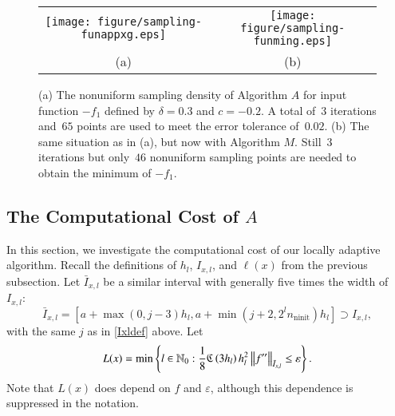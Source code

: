 \documentclass[review]{elsarticle}
\newcommand{\abstol}{\varepsilon}
\theoremstyle{definition}
\newcommand{\Ixl}{I_{x,l}}
\DeclareMathOperator{\ninit}{ninit}
\begin{document}
\begin{figure}[t]
	\begin{tabular}{cc}	
		\texttt{[image: figure/sampling-funappxg.eps]}
		&\texttt{[image: figure/sampling-funming.eps]}
		\\ (a) & (b)
	\end{tabular}
	\caption{(a) The nonuniform sampling density of Algorithm $A$ for input function
		$-f_1$ defined by $\delta = 0.3$ and $c = -0.2$. A total of~$3$ iterations
		and~$65$ points are used to meet the error tolerance 
		of~$0.02$.
		(b) The same situation as in (a), but now
		with Algorithm $M$. Still~$3$ iterations but only~$46$ nonuniform
		sampling points are needed to obtain the minimum of $-f_1$. 	
		\label{f3foolplot}}
\end{figure}

\subsection{The Computational Cost of $A$} \label{subsec:appxcost}

In this section, we investigate the computational cost of our locally adaptive
algorithm. Recall the definitions of $h_l$, $\Ixl$, and $\ell(x)$ from the
previous subsection. Let
$\bar{I}_{x,l}$ be a similar interval with generally five times the
width of~$\Ixl$:
\begin{equation} \label{barIxldef}
\bar{I}_{x,l}=\left[a+\max(0,j-3)h_l, a+ \min(j+2,2^l n_{\ninit})h_l\right] \supset \Ixl,
\end{equation}
with the same $j$ as in \eqref{Ixldef} above.  Let
\begin{equation}\label{eqn:defoflx}
L(x) = \min \left\{ l \in \mathbb{N}_0 :  \frac{1}{8} \fC\left(3h_l\right)h_l^2\norm[\bar{I}_{x,l}]{f''} \le \abstol \right\}.
\end{equation}
Note that $L(x)$ does depend on $f$ and $\abstol$, although this dependence is
suppressed in the notation.
\end{document}
